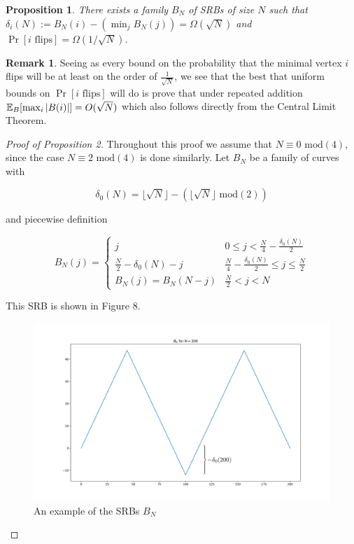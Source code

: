 \documentclass{article}
\newtheorem{proposition}{Proposition}
\theoremstyle{definition}
\newtheorem{remark}{Remark}
\begin{document}
\begin{proposition} There exists a family $B_N$ of SRBs of size $N$ such that $\delta_i(N):=B_N(i)-(\min_jB_N(j))=\Omega(\sqrt{N})$ and $\Pr[i \,\, \mathrm{flips}]=\Omega(1/\sqrt{N})$.
\end{proposition}

\begin{remark}
Seeing as every bound on the probability that the minimal vertex $i$ flips will be at least on the order of $\frac{1}{\sqrt{N}}$, we see that the best that uniform bounds on $\Pr[i \,\, \mathrm{flips}]$ will do is prove that under repeated addition $\mathbb{E}_{B}[\max_i|B(i)|]=O(\sqrt{N})$  which also follows directly from the Central Limit Theorem.
\end{remark}

\begin{proof}[Proof of Proposition 2] Throughout this proof we assume that $N\equiv0\,\,\mathrm{mod}(4)$, since the case $N\equiv 2\,\,\mathrm{mod}(4)$ is done similarly. Let $B_N$ be a family of curves with

$$\delta_0(N)=\lfloor \sqrt{N}\rfloor - (\lfloor \sqrt{N}\rfloor\,\,\mathrm{mod}(2))$$

and piecewise definition

\begin{equation*}
B_N(j)=
\begin{cases}
j & 0\leq j < \frac{N}{4}-\frac{\delta_0(N)}{2}\\
\frac{N}{2}-\delta_0(N)-j & \frac{N}{4}-\frac{\delta_0(N)}{2}\leq j \leq \frac{N}{2}\\
B_N(j)=B_N(N-j) & \frac{N}{2}<j<N
\end{cases}
\end{equation*}


This SRB is shown in Figure 8.

\begin{figure}[h!]
\caption{An example of the SRBs $B_N$}
\centering
\includegraphics[width=\textwidth]{Figure_8}
\end{figure}


\end{proof}
\end{document}
